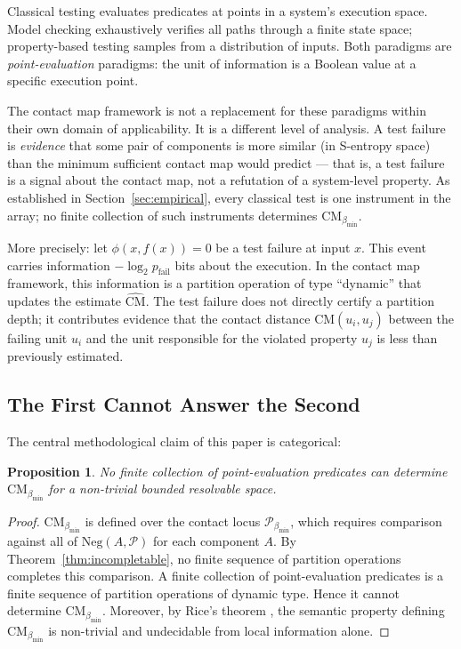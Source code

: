 \documentclass[12pt,a4paper,twocolumn]{article}
\theoremstyle{plain}
\newtheorem{proposition}[theorem]{Proposition}
\theoremstyle{definition}
\theoremstyle{remark}
\newcommand{\Part}{\mathcal{P}}
\newcommand{\CM}{\mathrm{CM}}
\newcommand{\bmin}{\beta_{\min}}
\newcommand{\Neg}{\mathrm{Neg}}
\newcommand{\CMbmin}{\CM_{\bmin}}
\begin{document}
Classical testing \citep{clarke1999model, baier2008principles} evaluates
predicates at points in a system's execution space.  Model checking
exhaustively verifies all paths through a finite state space; property-based
testing samples from a distribution of inputs.  Both paradigms are
\emph{point-evaluation} paradigms: the unit of information is a Boolean value
at a specific execution point.

The contact map framework is not a replacement for these paradigms within
their own domain of applicability.  It is a different level of analysis.
A test failure is \emph{evidence} that some pair of components is more
similar (in S-entropy space) than the minimum sufficient contact map would
predict --- that is, a test failure is a signal about the contact map, not
a refutation of a system-level property.  As established in
Section~\ref{sec:empirical}, every classical test is one instrument in the
array; no finite collection of such instruments determines $\CMbmin$.

More precisely: let $\phi(x, f(x)) = 0$ be a test failure at input $x$.
This event carries information $-\log_2 p_{\text{fail}}$ bits about the
execution.  In the contact map framework, this information is a partition
operation of type ``dynamic'' that updates the estimate $\hat{\CM}$.  The
test failure does not directly certify a partition depth; it contributes
evidence that the contact distance $\CM(u_i, u_j)$ between the failing unit
$u_i$ and the unit responsible for the violated property $u_j$ is less than
previously estimated.

\subsection{The First Cannot Answer the Second}

The central methodological claim of this paper is categorical:

\begin{proposition}
No finite collection of point-evaluation predicates can determine $\CMbmin$
for a non-trivial bounded resolvable space.
\end{proposition}

\begin{proof}
$\CMbmin$ is defined over the contact locus $\Part_{\bmin}$, which requires
comparison against all of $\Neg(A, \Part)$ for each component $A$.  By
Theorem~\ref{thm:incompletable}, no finite sequence of partition operations
completes this comparison.  A finite collection of point-evaluation
predicates is a finite sequence of partition operations of dynamic type.
Hence it cannot determine $\CMbmin$.  Moreover, by Rice's theorem
\citep{rice1953classes}, the semantic property defining $\CMbmin$ is
non-trivial and undecidable from local information alone.
\end{proof}
\end{document}

